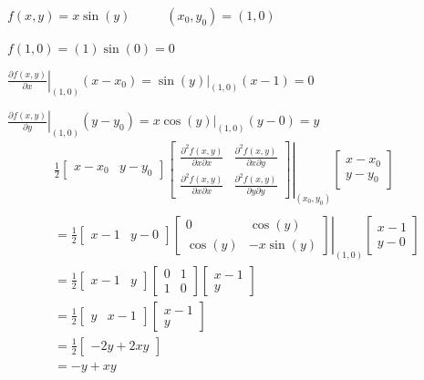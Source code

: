 \documentclass[
  portuguese,
  letterpaper,
  DIV=11,
  numbers=noendperiod]{scrreport}
\begin{document}
\(f(x,y) = x \sin(y) \phantom{---} (x_0,y_0) = (1,0)\)

\(f(1,0) = (1) \sin(0) = 0\)

\(\left. \frac{\partial f(x,y)}{\partial x} \right |_{(1,0)} (x-x_0) = \left. \sin(y) \right |_{(1,0)}(x-1)=0\)

\(\left. \frac{\partial f(x,y)}{\partial y} \right |_{(1,0)} (y-y_0) = \left.  x\cos(y) \right |_{(1,0)}(y-0)=y\)
\[
\begin{aligned}
& \frac{1}{2} \begin{bmatrix} x-x_0 & y-y_0 \end{bmatrix}
\left. \begin{bmatrix} \frac{\partial^2f(x,y)}{\partial x\partial x} & \frac{\partial^2f(x,y)}{\partial x \partial y}\\ 
      \frac{\partial^2f(x,y)}{\partial x\partial x} & \frac{\partial^2f(x,y)}{\partial y\partial y} \end{bmatrix}
      \right |_{(x_0,y_0)}
\begin{bmatrix} x-x_0 \\ y-y_0 \end{bmatrix} & \\ \\
& = \frac{1}{2} \begin{bmatrix} x-1 & y-0 \end{bmatrix}
\left. \begin{bmatrix} 0 & \cos(y)\\ 
           \cos(y) & -x \sin(y) \end{bmatrix}
           \right |_{(1,0)}
\begin{bmatrix} x-1 \\ y-0 \end{bmatrix} & \\
& = \frac{1}{2} \begin{bmatrix} x-1 & y \end{bmatrix}
\begin{bmatrix} 0 & 1 \\ 1 & 0 \end{bmatrix}
\begin{bmatrix} x-1 \\ y \end{bmatrix} & \\
& = \frac{1}{2} \begin{bmatrix} y & x-1 \end{bmatrix}
\begin{bmatrix} x-1 \\ y \end{bmatrix} & \\
& = \frac{1}{2} \begin{bmatrix} -2y+2xy \end{bmatrix} &\\
& = -y+xy &
\end{aligned}
\]
\end{document}
